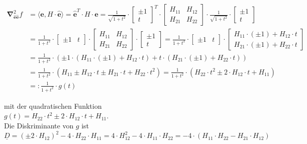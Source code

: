 \documentclass[10pt]{article}
\begin{document}
\begin{align*}
\boldsymbol{\nabla}_{\hat{\mathbf{e}} \hat{\mathbf{e}}}^{2} f & =\langle\hat{\mathbf{e}}, H \cdot \hat{\mathbf{e}}\rangle=\hat{\mathbf{e}}^{T} \cdot H \cdot \hat{\mathbf{e}}=\frac{1}{\sqrt{1+t^{2}}} \cdot\left[\begin{array}{c} 
\pm 1 \\
t
\end{array}\right]^{T} \cdot\left[\begin{array}{cc}
H_{11} & H_{12} \\
H_{21} & H_{22}
\end{array}\right] \cdot \frac{1}{\sqrt{1+t^{2}}} \cdot\left[\begin{array}{c} 
\pm 1 \\
t
\end{array}\right] \\
& =\frac{1}{1+t^{2}} \cdot\left[\begin{array}{ll} 
\pm 1 & t
\end{array}\right] \cdot\left[\begin{array}{cc}
H_{11} & H_{12} \\
H_{21} & H_{22}
\end{array}\right] \cdot\left[\begin{array}{c} 
\pm 1 \\
t
\end{array}\right]=\frac{1}{1+t^{2}} \cdot\left[\begin{array}{cc} 
\pm 1 & t
\end{array}\right] \cdot\left[\begin{array}{c}
H_{11} \cdot( \pm 1)+H_{12} \cdot t \\
H_{21} \cdot( \pm 1)+H_{22} \cdot t
\end{array}\right] \\
& =\frac{1}{1+t^{2}} \cdot\left( \pm 1 \cdot\left(H_{11} \cdot( \pm 1)+H_{12} \cdot t\right)+t \cdot\left(H_{21} \cdot( \pm 1)+H_{22} \cdot t\right)\right) \\
& =\frac{1}{1+t^{2}} \cdot\left(H_{11} \pm H_{12} \cdot t \pm H_{21} \cdot t+H_{22} \cdot t^{2}\right)=\frac{1}{1+t^{2}} \cdot\left(H_{22} \cdot t^{2} \pm 2 \cdot H_{12} \cdot t+H_{11}\right) \\
& =: \frac{1}{1+t^{2}} \cdot g(t) \tag{2.206}
\end{align*}


mit der quadratischen Funktion\\
$g(t)=H_{22} \cdot t^{2} \pm 2 \cdot H_{12} \cdot t+H_{11}$.\\
Die Diskriminante von $g$ ist\\
$\underline{D}=\left( \pm 2 \cdot H_{12}\right)^{2}-4 \cdot H_{22} \cdot H_{11}=4 \cdot H_{12}^{2}-4 \cdot H_{11} \cdot H_{22}=-4 \cdot\left(H_{11} \cdot H_{22}-H_{21} \cdot H_{12}\right)$
\end{document}
